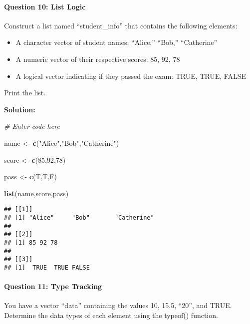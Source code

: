\documentclass[
]{article}
\newenvironment{Shaded}{\begin{snugshade}}{\end{snugshade}}
\newcommand{\CommentTok}[1]{\textcolor[rgb]{0.56,0.35,0.01}{\textit{#1}}}
\newcommand{\DecValTok}[1]{\textcolor[rgb]{0.00,0.00,0.81}{#1}}
\newcommand{\FunctionTok}[1]{\textcolor[rgb]{0.13,0.29,0.53}{\textbf{#1}}}
\newcommand{\NormalTok}[1]{#1}
\newcommand{\OtherTok}[1]{\textcolor[rgb]{0.56,0.35,0.01}{#1}}
\newcommand{\StringTok}[1]{\textcolor[rgb]{0.31,0.60,0.02}{#1}}
\begin{document}
\hypertarget{question-10-list-logic}{%
\paragraph{Question 10: List Logic}\label{question-10-list-logic}}

Construct a list named ``student\_info'' that contains the following
elements:

\begin{itemize}
\item
  A character vector of student names: ``Alice,'' ``Bob,'' ``Catherine''
\item
  A numeric vector of their respective scores: 85, 92, 78
\item
  A logical vector indicating if they passed the exam: TRUE, TRUE, FALSE
\end{itemize}

Print the list.

\textbf{Solution:}

\begin{Shaded}
\begin{Highlighting}[]
\CommentTok{\# Enter code here}

\NormalTok{name }\OtherTok{\textless{}{-}} \FunctionTok{c}\NormalTok{(}\StringTok{"Alice"}\NormalTok{,}\StringTok{"Bob"}\NormalTok{,}\StringTok{"Catherine"}\NormalTok{)}

\NormalTok{score }\OtherTok{\textless{}{-}} \FunctionTok{c}\NormalTok{(}\DecValTok{85}\NormalTok{,}\DecValTok{92}\NormalTok{,}\DecValTok{78}\NormalTok{)}

\NormalTok{pass }\OtherTok{\textless{}{-}} \FunctionTok{c}\NormalTok{(T,T,F)}

\FunctionTok{list}\NormalTok{(name,score,pass)}
\end{Highlighting}
\end{Shaded}

\begin{verbatim}
## [[1]]
## [1] "Alice"     "Bob"       "Catherine"
## 
## [[2]]
## [1] 85 92 78
## 
## [[3]]
## [1]  TRUE  TRUE FALSE
\end{verbatim}

\hypertarget{question-11-type-tracking}{%
\paragraph{Question 11: Type Tracking}\label{question-11-type-tracking}}

You have a vector ``data'' containing the values 10, 15.5, ``20'', and
TRUE. Determine the data types of each element using the typeof()
function.
\end{document}
